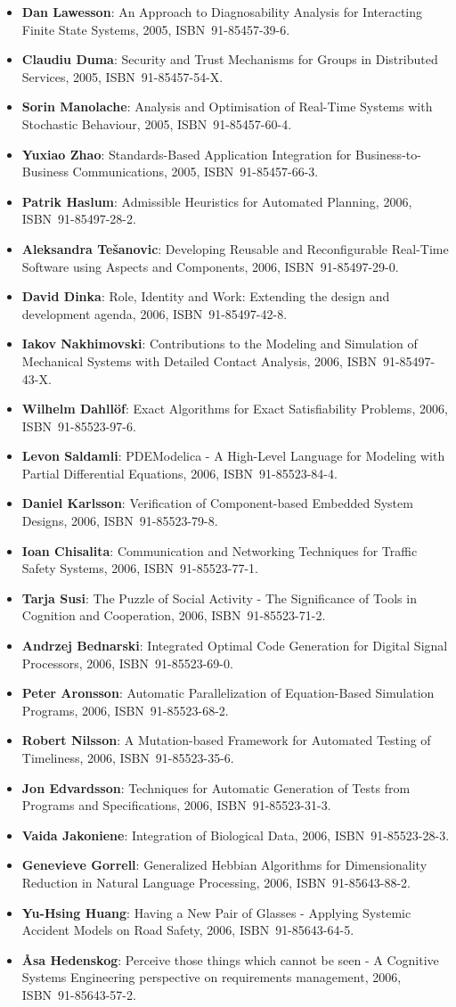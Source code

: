 \documentclass[a4paper,showtrims,twocolumn]{memoir}
\newenvironment{theses}{
  \begin{itemize}
    \setlength{\itemsep}{0.2em}
    \setlength{\parskip}{0em}
    \setlength{\parsep}{0em}
}{
  \end{itemize}
}
\newcommand{\thesis}[5]{\item[No. #1] \textbf{#2}: #3, #4, ISBN~#5.}
\begin{document}
\begin{theses}
    \thesis{974}{Dan Lawesson}{An Approach to Diagnosability Analysis for Interacting Finite State Systems}{2005}{91-85457-39-6}
    \thesis{979}{Claudiu Duma}{Security and Trust Mechanisms for Groups in Distributed Services}{2005}{91-85457-54-X}
    \thesis{983}{Sorin Manolache}{Analysis and Optimisation of Real-Time Systems with Stochastic Behaviour}{2005}{91-85457-60-4}
    \thesis{986}{Yuxiao Zhao}{Standards-Based Application Integration for Business-to-Business Communications}{2005}{91-85457-66-3}
    \thesis{1004}{Patrik Haslum}{Admissible Heuristics for Automated Planning}{2006}{91-85497-28-2}
    \thesis{1005}{Aleksandra Tešanovic}{Developing Reusable and Reconfigurable Real-Time Software using Aspects and Components}{2006}{91-85497-29-0}
    \thesis{1008}{David Dinka}{Role, Identity and Work: Extending the design and development agenda}{2006}{91-85497-42-8}
    \thesis{1009}{Iakov Nakhimovski}{Contributions to the Modeling and Simulation of Mechanical Systems with Detailed Contact Analysis}{2006}{91-85497-43-X}
    \thesis{1013}{Wilhelm Dahllöf}{Exact Algorithms for Exact Satisfiability Problems}{2006}{91-85523-97-6}
    \thesis{1016}{Levon Saldamli}{PDEModelica - A High-Level Language for Modeling with Partial Differential Equations}{2006}{91-85523-84-4}
    \thesis{1017}{Daniel Karlsson}{Verification of Component-based Embedded System Designs}{2006}{91-85523-79-8}
    \thesis{1018}{Ioan Chisalita}{Communication and Networking Techniques for Traffic Safety Systems}{2006}{91-85523-77-1}
    \thesis{1019}{Tarja Susi}{The Puzzle of Social Activity - The Significance of Tools in Cognition and Cooperation}{2006}{91-85523-71-2}
    \thesis{1021}{Andrzej Bednarski}{Integrated Optimal Code Generation for Digital Signal Processors}{2006}{91-85523-69-0}
    \thesis{1022}{Peter Aronsson}{Automatic Parallelization of Equation-Based Simulation Programs}{2006}{91-85523-68-2}
    \thesis{1030}{Robert Nilsson}{A Mutation-based Framework for Automated Testing of Timeliness}{2006}{91-85523-35-6}
    \thesis{1034}{Jon Edvardsson}{Techniques for Automatic Generation of Tests from Programs and Specifications}{2006}{91-85523-31-3}
    \thesis{1035}{Vaida Jakoniene}{Integration of Biological Data}{2006}{91-85523-28-3}
    \thesis{1045}{Genevieve Gorrell}{Generalized Hebbian Algorithms for Dimensionality Reduction in Natural Language Processing}{2006}{91-85643-88-2}
    \thesis{1051}{Yu-Hsing Huang}{Having a New Pair of Glasses - Applying Systemic Accident Models on Road Safety}{2006}{91-85643-64-5}
    \thesis{1054}{Åsa Hedenskog}{Perceive those things which cannot be seen - A Cognitive Systems Engineering perspective on requirements management}{2006}{91-85643-57-2}

\end{theses}
\end{document}
